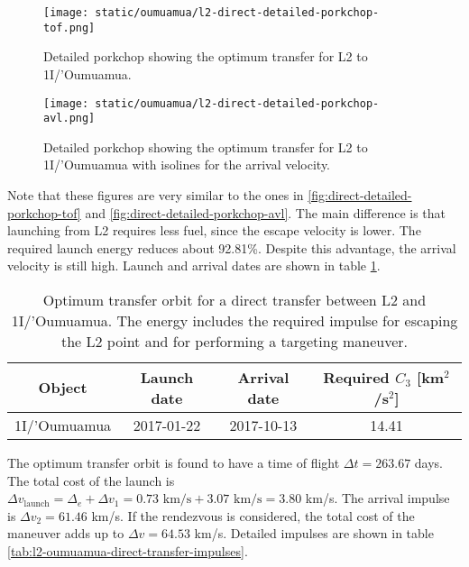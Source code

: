 \begin{figure}[H]
  \centering
  \texttt{[image: static/oumuamua/l2-direct-detailed-porkchop-tof.png]}
        \caption[Detailed porkchop showing the optimum transfer for
        L2 to 1I/'Oumuamua with the time of flight.]{Detailed porkchop showing the optimum transfer for
        L2 to 1I/'Oumuamua. 
  }
  \label{fig:l2-oumuamua-optimum-porkchop}
\end{figure}

\begin{figure}[H]
  \centering
  \texttt{[image: static/oumuamua/l2-direct-detailed-porkchop-avl.png]}
        \caption[Detailed porkchop showing the optimum transfer for
        L2 to 1I/'Oumuamua with the arrival velocity.]{Detailed porkchop showing the
        optimum transfer for L2 to 1I/'Oumuamua with isolines for the arrival
        velocity.}
  \label{fig:l2-oumuamua-optimum-porkchop-avl}
\end{figure}

Note that these figures are very similar to the ones in
\ref{fig:direct-detailed-porkchop-tof} and
\ref{fig:direct-detailed-porkchop-avl}. The main difference is that launching
from L2 requires less fuel, since the escape velocity is lower. The required
launch energy reduces about 92.81\%. Despite this advantage, the arrival
velocity is still high. Launch and arrival dates are shown in table
\ref{tab:l2-oumuamua-direct-transfer-optimum}.

\vspace{1cm}
\begin{table}[H]
  \centering
  \begin{tabular}{|c|c|c|c|}
    \hline
    Object & Launch date & Arrival date & Required $C_3$ [km$^2$/s$^2$] \\
    \hline
    1I/'Oumuamua & 2017-01-22 & 2017-10-13 & 14.41 \\
    \hline
  \end{tabular}
  \caption[Optimum transfer orbit for a direct transfer between L2 and
        1I/'Oumuamua.]{Optimum transfer orbit for a direct transfer between
        L2 and 1I/'Oumuamua. The energy includes the required impulse for
        escaping the L2 point and for performing a targeting maneuver.}
  \label{tab:l2-oumuamua-direct-transfer-optimum}
\end{table}

The optimum transfer orbit is found to have a time of flight $\Delta t = 263.67$
days. The total cost of the launch is $\Delta v_\text{launch} = \Delta_e +
\Delta v_1 = 0.73 \text{ km/s} + 3.07 \text{ km/s} = 3.80$ km/s. The arrival
impulse is $\Delta v_2 = 61.46$ km/s. If the rendezvous is considered, the total
cost of the maneuver adds up to $\Delta v = 64.53$ km/s. Detailed impulses are
shown in table \ref{tab:l2-oumuamua-direct-transfer-impulses}.

